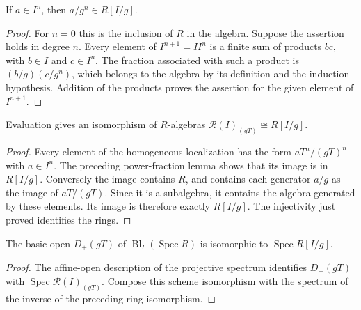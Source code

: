 \endgroup

\begingroup

\begin{lemma}
\label{lem:affine-blowup-ideal-power-fraction}
\leanok
If $a\in I^n$, then $a/g^n\in R[I/g]$.
\end{lemma}
\begin{proof}
For $n=0$ this is the inclusion of $R$ in the algebra. Suppose the assertion
holds in degree $n$. Every element of $I^{n+1}=I I^n$ is a finite sum of products
$bc$, with $b\in I$ and $c\in I^n$. The fraction associated with such a product
is $(b/g)(c/g^n)$, which belongs to the algebra by its definition and the
induction hypothesis. Addition of the products proves the assertion for the
given element of $I^{n+1}$.
\end{proof}

\endgroup

\begingroup

\begin{lemma}
\label{lem:affine-blowup-chart-ring}
\leanok
Evaluation gives an isomorphism of $R$-algebras
$\mathcal R(I)_{(gT)}\cong R[I/g]$.
\end{lemma}
\begin{proof}
Every element of the homogeneous localization has the form
$aT^n/(gT)^n$ with $a\in I^n$. The preceding power-fraction lemma shows that
its image is in $R[I/g]$. Conversely the image contains $R$, and contains
each generator $a/g$ as the image of $aT/(gT)$. Since it is a subalgebra, it
contains the algebra generated by these elements. Its image is therefore
exactly $R[I/g]$. The injectivity just proved identifies the rings.
\end{proof}

\endgroup

\begingroup

\begin{corollary}
\label{cor:affine-blowup-chart-scheme}
\leanok
The basic open $D_+(gT)$ of $\operatorname{Bl}_I(\operatorname{Spec}R)$ is
isomorphic to $\operatorname{Spec}R[I/g]$.
\end{corollary}
\begin{proof}
The affine-open description of the projective spectrum identifies $D_+(gT)$
with $\operatorname{Spec}\mathcal R(I)_{(gT)}$. Compose this scheme isomorphism
with the spectrum of the inverse of the preceding ring isomorphism.
\end{proof}

